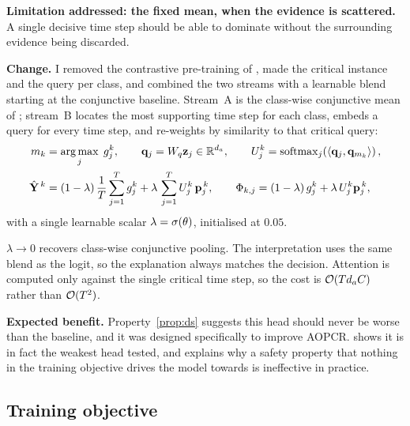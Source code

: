 \textbf{Limitation addressed: the fixed mean, when the evidence is scattered.} A single decisive
time step
should be able to dominate without the surrounding evidence being discarded.

\textbf{Change.} I removed the contrastive pre-training of \citet{li2021dsmil}, made the critical
instance and the query per class, and combined the two streams with a learnable blend starting at
the conjunctive baseline. Stream~A is the class-wise conjunctive mean of ;
stream~B locates the most supporting time step for each class, embeds a query for every time step,
and re-weights by similarity to that critical query:
\begin{align}
  m_k &= \operatorname*{arg\,max}_{j} \; g_j^k ,
  \qquad
  \mathbf{q}_j = W_q \mathbf{z}_j \in \mathbb{R}^{d_a},
  \qquad
  U_j^k = \operatorname{softmax}_j\!\left(\langle \mathbf{q}_j, \mathbf{q}_{m_k}\rangle\right),
  \label{eq:ds_query}\\
  \hat{\mathbf{Y}}^{\,k} &= (1-\lambda)\,\frac{1}{T}\sum_{j=1}^{T} g_j^k
                 + \lambda\,\sum_{j=1}^{T} U_j^k \, \mathbf{p}_j^{\,k},
  \qquad
  \Phi_{k,j} = (1-\lambda)\, g_j^k + \lambda\, U_j^k \mathbf{p}_j^{\,k},
  \label{eq:ds_blend}
\end{align}
with a single learnable scalar $\lambda = \sigma(\theta)$, initialised at $0.05$.

\begin{property}
\label{prop:ds}
$\lambda \to 0$ recovers class-wise conjunctive pooling. The interpretation uses the same blend as
the logit, so the explanation always matches the decision. Attention is computed only against the
single critical time step, so the cost is $\mathcal{O}(T d_a C)$ rather than
$\mathcal{O}(T^2)$.
\end{property}

\textbf{Expected benefit.} Property~\ref{prop:ds} suggests this head should never be worse than the
baseline, and it was designed specifically to improve AOPCR.  shows it is in
fact the weakest head tested, and explains why a safety property that nothing in the training
objective drives the model towards is ineffective in practice.

\subsection{Training objective}
\label{sec:methods:loss}

